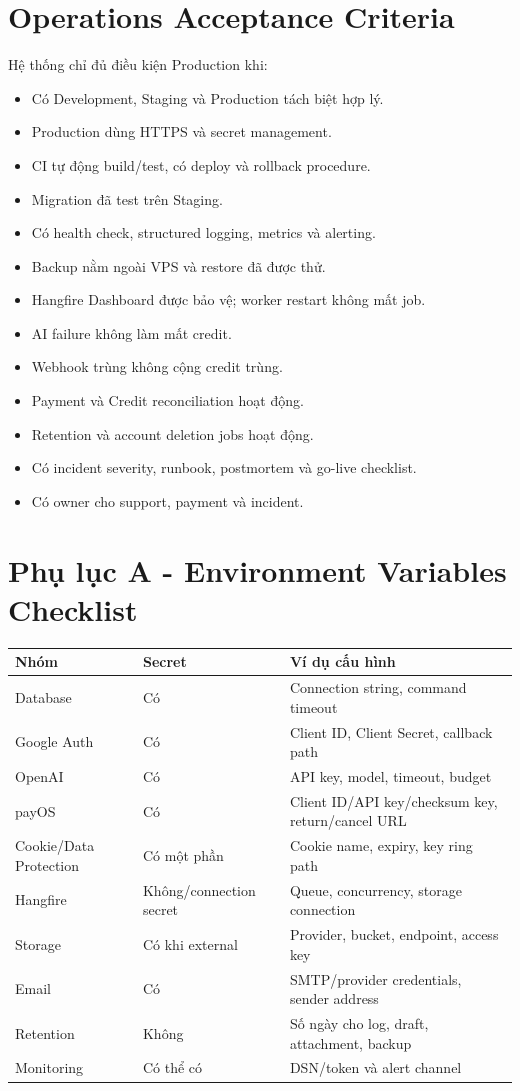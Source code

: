\documentclass[11pt,a4paper]{article}
\begin{document}
\section{Operations Acceptance Criteria}

Hệ thống chỉ đủ điều kiện Production khi:

\begin{itemize}
  \item Có Development, Staging và Production tách biệt hợp lý.
  \item Production dùng HTTPS và secret management.
  \item CI tự động build/test, có deploy và rollback procedure.
  \item Migration đã test trên Staging.
  \item Có health check, structured logging, metrics và alerting.
  \item Backup nằm ngoài VPS và restore đã được thử.
  \item Hangfire Dashboard được bảo vệ; worker restart không mất job.
  \item AI failure không làm mất credit.
  \item Webhook trùng không cộng credit trùng.
  \item Payment và Credit reconciliation hoạt động.
  \item Retention và account deletion jobs hoạt động.
  \item Có incident severity, runbook, postmortem và go-live checklist.
  \item Có owner cho support, payment và incident.
\end{itemize}

\section{Phụ lục A - Environment Variables Checklist}

\begin{longtable}{L{0.34\textwidth}L{0.20\textwidth}L{0.38\textwidth}}
\toprule
\textbf{Nhóm} & \textbf{Secret} & \textbf{Ví dụ cấu hình} \\
\midrule
Database & Có & Connection string, command timeout \\
Google Auth & Có & Client ID, Client Secret, callback path \\
OpenAI & Có & API key, model, timeout, budget \\
payOS & Có & Client ID/API key/checksum key, return/cancel URL \\
Cookie/Data Protection & Có một phần & Cookie name, expiry, key ring path \\
Hangfire & Không/connection secret & Queue, concurrency, storage connection \\
Storage & Có khi external & Provider, bucket, endpoint, access key \\
Email & Có & SMTP/provider credentials, sender address \\
Retention & Không & Số ngày cho log, draft, attachment, backup \\
Monitoring & Có thể có & DSN/token và alert channel \\
\bottomrule
\end{longtable}
\end{document}

